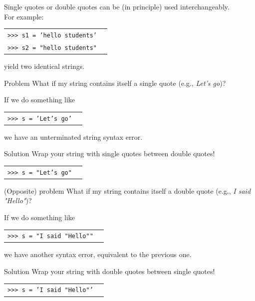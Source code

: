 \documentclass[t,handout,9pt]{beamer}
\begin{document}
\begin{frame}
\vfill
Single quotes or double quotes can be (in principle) used interchangeably.\\
For example:
\begin{table}[]
\begin{tabular}{ll}
\texttt{>{}>{}> s1 = 'hello students'} & \\
\texttt{>{}>{}> s2 = "hello students"} & \\
\end{tabular}
\end{table}
yield two identical strings.
\vfill
\begin{block}{Problem}
What if my string contains itself a single quote (e.g., \textit{Let's go})?
\end{block}
If we do something like
\begin{table}[]
\begin{tabular}{ll}
\texttt{>{}>{}> s = 'Let's go'} & \\
\end{tabular}
\end{table}
we have an unterminated string syntax error.
\vfill
\begin{block}{Solution}
Wrap your string with single quotes between double quotes!
\end{block}
\vfill
\begin{table}[]
\begin{tabular}{ll}
\texttt{>{}>{}> s = "Let's go"} & \\
\end{tabular}
\end{table}
\vfill
\end{frame}
%
\begin{frame}
\vfill
\begin{block}{(Opposite) problem}
What if my string contains itself a double quote (e.g., \textit{I said "Hello"})?
\end{block}
If we do something like
\begin{table}[]
\begin{tabular}{ll}
\texttt{>{}>{}> s = "I said "Hello""} & \\
\end{tabular}
\end{table}
we have another syntax error, equivalent to the previous one.
\vfill
\begin{block}{Solution}
Wrap your string with double quotes between single quotes!
\end{block}
\vfill
\begin{table}[]
\begin{tabular}{ll}
\texttt{>{}>{}> s = 'I said "Hello"'} & \\
\end{tabular}
\end{table}
\vfill
\end{frame}
\end{document}
